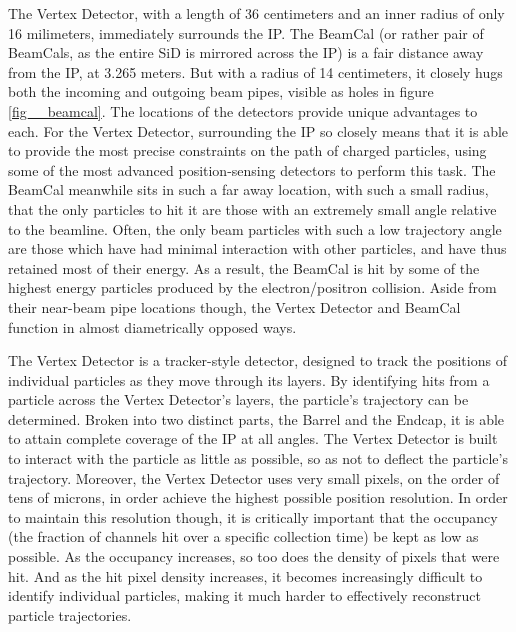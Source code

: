 \documentclass{report}
\begin{document}
                The Vertex Detector, with a length of 36 centimeters and an inner radius of only 16 milimeters, immediately surrounds the IP. The BeamCal (or rather pair of BeamCals, as the entire SiD is mirrored across the IP) is a fair distance away from the IP, at 3.265 meters. But with a radius of 14 centimeters, it closely hugs both the incoming and outgoing beam pipes, visible as holes in figure \ref{fig__beamcal}. The locations of the detectors provide unique advantages to each. For the Vertex Detector, surrounding the IP so closely means that it is able to provide the most precise constraints on the path of charged particles, using some of the most advanced position-sensing detectors to perform this task. The BeamCal meanwhile sits in such a far away location, with such a small radius, that the only particles to hit it are those with an extremely small angle relative to the beamline. Often, the only beam particles with such a low trajectory angle are those which have had minimal interaction with other particles, and have thus retained most of their energy. As a result, the BeamCal is hit by some of the highest energy particles produced by the electron/positron collision. Aside from their near-beam pipe locations though, the Vertex Detector and BeamCal function in almost diametrically opposed ways.

                The Vertex Detector is a tracker-style detector, designed to track the positions of individual particles as they move through its layers. By identifying hits from a particle across the Vertex Detector's layers, the particle's trajectory can be determined. Broken into two distinct parts, the Barrel and the Endcap, it is able to attain complete coverage of the IP at all angles. The Vertex Detector is built to interact with the particle as little as possible, so as not to deflect the particle's trajectory. Moreover, the Vertex Detector uses very small pixels, on the order of tens of microns, in order achieve the highest possible position resolution. In order to maintain this resolution though, it is critically important that the occupancy (the fraction of channels hit over a specific collection time) be kept as low as possible. As the occupancy increases, so too does the density of pixels that were hit. And as the hit pixel density increases, it becomes increasingly difficult to identify individual particles, making it much harder to effectively reconstruct particle trajectories.
                
\end{document}
